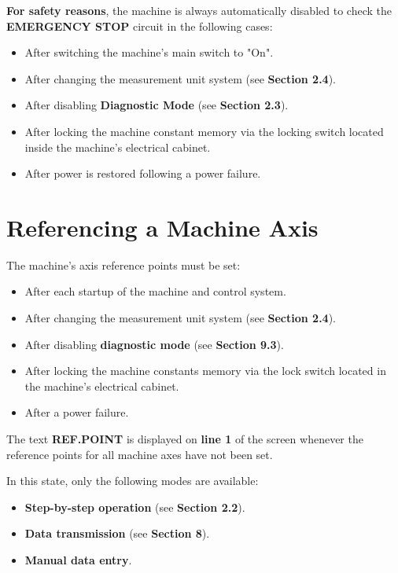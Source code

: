 \textbf{For safety reasons}, the machine is always automatically disabled to check the \textbf{EMERGENCY STOP} circuit in the following cases:

\begin{itemize}
    \item After switching the machine’s main switch to "On".
    \item After changing the measurement unit system (see \textbf{Section 2.4}).
    \item After disabling \textbf{Diagnostic Mode} (see \textbf{Section 2.3}).
    \item After locking the machine constant memory via the locking switch located inside the machine’s electrical cabinet.
    \item After power is restored following a power failure.
\end{itemize}

\section{Referencing a Machine Axis}

The machine's axis reference points must be set:
\begin{itemize}
    \item After each startup of the machine and control system.
    \item After changing the measurement unit system (see \textbf{Section 2.4}).
    \item After disabling \textbf{diagnostic mode} (see \textbf{Section 9.3}).
    \item After locking the machine constants memory via the lock switch located in the machine’s electrical cabinet.
    \item After a power failure.
\end{itemize}

The text \textbf{REF.POINT} is displayed on \textbf{line 1} of the screen whenever the reference points for all machine axes have not been set.

In this state, only the following modes are available:
\begin{itemize}
    \item \textbf{Step-by-step operation} (see \textbf{Section 2.2}).
    \item \textbf{Data transmission} (see \textbf{Section 8}).
    \item \textbf{Manual data entry}.
\end{itemize}


